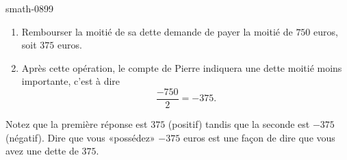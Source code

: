 
\begin{corrige}{smath-0899}

    \begin{enumerate}
        \item
            Rembourser la moitié de sa dette demande de payer la moitié de \( 750\) euros, soit \( 375\) euros.
        \item
            Après cette opération, le compte de Pierre indiquera une dette moitié moins importante, c'est à dire
            \begin{equation}
                \frac{ -750 }{ 2 }=-375.
            \end{equation}
    \end{enumerate}
    Notez que la première réponse est \( 375\) (positif) tandis que la seconde est \( -375\) (négatif). Dire que vous «possédez» \( -375\) euros est une façon de dire que vous avez une dette de \( 375\).

\end{corrige}
